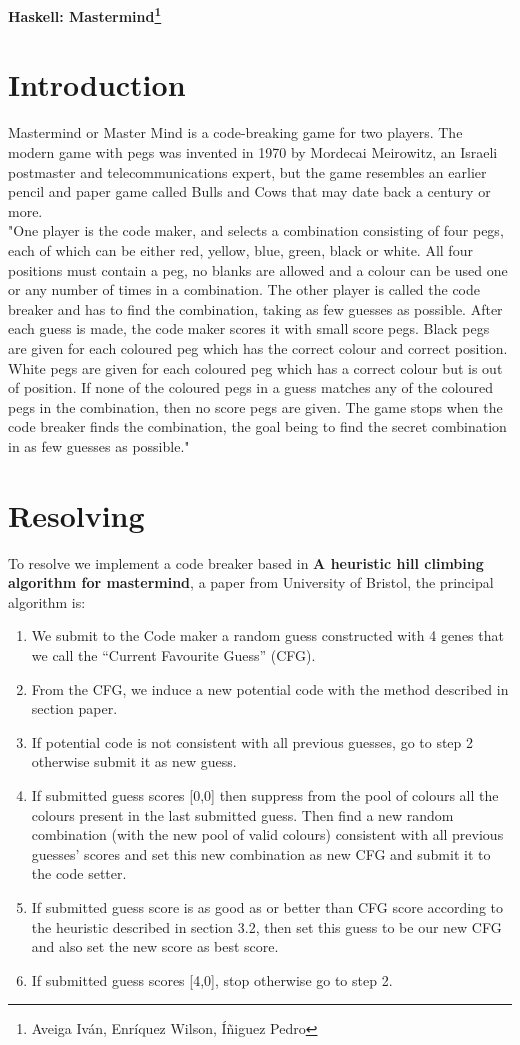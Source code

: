 \textbf{Haskell: Mastermind\footnote{Aveiga Iván, Enríquez Wilson, Íñiguez Pedro}}

\section{Introduction}
Mastermind or Master Mind is a code-breaking game for two players. The modern game with pegs was invented in 1970 by Mordecai Meirowitz, an Israeli postmaster and telecommunications expert, but the game resembles an earlier pencil and paper game called Bulls and Cows that may date back a century or more. \\

"One player is the code maker, and selects a combination consisting of four pegs, each of which can be either red, yellow, blue, green, black or white. All four positions must contain a peg, no blanks are allowed and a colour can be used one or any number of times in a combination. The other player is called the code breaker and has to find
the combination, taking as few guesses as possible. After each guess is made, the code maker scores it
with small score pegs. Black pegs are given for each coloured peg which has the correct colour and correct
position. White pegs are given for each coloured peg which has a correct colour but is out of position. If
none of the coloured pegs in a guess matches any of the coloured pegs in the combination, then no score
pegs are given. The game stops when the code breaker finds the combination, the goal being to find
the secret combination in as few guesses as possible."

\section{Resolving}
To resolve we implement a code breaker based in \textbf{
A heuristic hill climbing algorithm for mastermind}, a paper from University of Bristol, the principal algorithm is: 
 \begin{enumerate}
 	\item We submit to the Code maker a random guess
 	constructed with 4 genes that we call the “Current
 	Favourite Guess” (CFG).
 	\item From the CFG, we induce a new potential code
 	with the method described in section paper.
 	\item If potential code is not consistent with all previous
 	guesses, go to step 2 otherwise submit it as new
 	guess.
 	\item If submitted guess scores [0,0] then suppress from
 	the pool of colours all the colours present in the last
 	submitted guess. Then find a new random
 	combination (with the new pool of valid colours)
 	consistent with all previous guesses’ scores and set
 	this new combination as new CFG and submit it to
 	the code setter.
 	\item If submitted guess score is as good as or better
 	than CFG score according to the heuristic described
 	in section 3.2, then set this guess to be our new CFG
 	and also set the new score as best score.
 	\item If submitted guess scores [4,0], stop otherwise go
 	to step 2.
 \end{enumerate}

